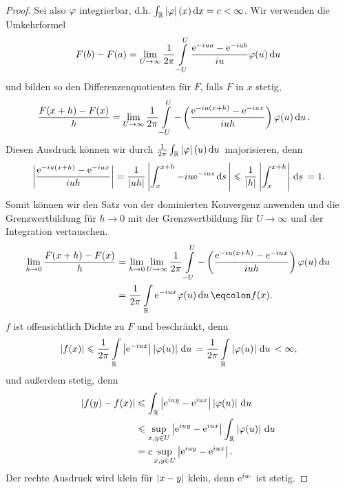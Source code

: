 \begin{proof}
Sei also $\varphi$ integrierbar, d.h. $\int_{\mathbb{R}} \left|\varphi\right|(x) \,\mathrm{d} x = c <\infty$.
Wir verwenden die Umkehrformel
\begin{align*}
F(b)-F(a) = \lim\limits_{U\to\infty} \frac{1}{2\pi}\int\limits_{-U}^U
\frac{\mathrm{e}^{-iua}-\mathrm{e}^{-iub}}{iu}\varphi(u)\,\mathrm{d} u\,
\end{align*}
und bilden so den Differenzenquotienten für $F$, falls $F$ in $x$ stetig,
\begin{align*}
\frac{F(x+h)-F(x)}{h}
&= \lim\limits_{U\to\infty} \frac{1}{2\pi}\int\limits_{-U}^U
-\left(\frac{\mathrm{e}^{-iu(x+h)}-\mathrm{e}^{-iux}}{iuh}\right)\varphi(u)\,\mathrm{d} u\,.
\end{align*}
Diesen Ausdruck können wir durch $\frac{1}{2\pi}\int_{\mathbb{R}} \left|\varphi\right|(u)\,\mathrm{d} u\,$
majorisieren, denn
\begin{align*}
\left|\frac{\mathrm{e}^{-iu(x+h)}-\mathrm{e}^{-iux}}{iuh}\right|
= 
\frac{1}{\left|uh\right|}
\left|\int_{x}^{x+h} -iu \mathrm{e}^{-ius}\,\mathrm{d} s\,\right|
\leqslant \frac{1}{\left|h\right|} \left|\int_{x}^{x+h}\right| \,\mathrm{d} s\,
= 1.
\end{align*}
% 
Somit können wir den Satz von der dominierten Konvergenz anwenden und die
Grenzwertbildung für $h\to 0$ mit der Grenzwertbildung für $U\to\infty$ und der
Integration  vertauschen.
\begin{align*}
\lim\limits_{h\to 0}
\frac{F(x+h)-F(x)}{h}
&=
\lim\limits_{h\to0}\lim\limits_{U\to\infty}
\frac{1}{2\pi}\int\limits_{-U}^U
-\left(\frac{\e^{-iu(x+h)}-\e^{-iux}}{iuh}\right)\ph(u)\du\\ 
&= \frac{1}{2\pi}\int\limits_{\R}
\e^{-iux}\ph(u)\du \defr f(x).
\end{align*}
$f$ ist offensichtlich Dichte zu $F$ und beschränkt, denn
\begin{align*}
\left|f(x)\right| \leqslant 
\frac{1}{2\pi}\int\limits_{\mathbb{R}}
\left|\mathrm{e}^{-iux}\right|\left|\varphi(u)\right|\,\mathrm{d} u\,
= 
\frac{1}{2\pi}\int\limits_{\mathbb{R}}
\left|\varphi(u)\right|\,\mathrm{d} u\, < \infty,
\end{align*}
und außerdem stetig, denn
\begin{align*}
\left|f(y)-f(x)\right|
&\leqslant \int_{\mathbb{R}} \left|\mathrm{e}^{iuy}-\mathrm{e}^{iux}\right|\left|\varphi(u)\right|\,\mathrm{d} u\,\\
&\leqslant \sup_{x,y\in U}  \left|\mathrm{e}^{iuy}-\mathrm{e}^{iux}\right|\int_{\mathbb{R}}
\left|\varphi(u)\right|\,\mathrm{d} u\, \\ &=
c\sup_{x,y\in U}  \left|\mathrm{e}^{iuy}-\mathrm{e}^{iux}\right|.
\end{align*}
Der rechte Ausdruck wird klein für $\left|x-y\right|$ klein, denn $\mathrm{e}^{iu\cdot}$ ist
stetig.\qedhere
\end{proof}

